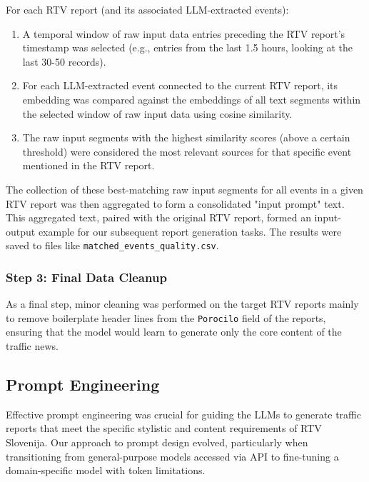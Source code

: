 \documentclass[fleqn,moreauthors,10pt]{ds_report}
\begin{document}
For each RTV report (and its associated LLM-extracted events):
\begin{enumerate}
    \item A temporal window of raw input data entries preceding the RTV report's timestamp was selected (e.g., entries from the last 1.5 hours, looking at the last 30-50 records).
    \item For each LLM-extracted event connected to the current RTV report, its embedding was compared against the embeddings of all text segments within the selected window of raw input data using cosine similarity.
    \item The raw input segments with the highest similarity scores (above a certain threshold) were considered the most relevant sources for that specific event mentioned in the RTV report.
\end{enumerate}
The collection of these best-matching raw input segments for all events in a given RTV report was then aggregated to form a consolidated "input prompt" text. This aggregated text, paired with the original RTV report, formed an input-output example for our subsequent report generation tasks. The results were saved to files like \texttt{matched\_events\_quality.csv}.

\subsubsection*{Step 3: Final Data Cleanup}
As a final step, minor cleaning was performed on the target RTV reports mainly to remove boilerplate header lines from the \texttt{Porocilo} field of the reports, ensuring that the model would learn to generate only the core content of the traffic news.

\subsection*{Prompt Engineering}
Effective prompt engineering was crucial for guiding the LLMs to generate traffic reports that meet the specific stylistic and content requirements of RTV Slovenija. Our approach to prompt design evolved, particularly when transitioning from general-purpose models accessed via API to fine-tuning a domain-specific model with token limitations.
\end{document}
